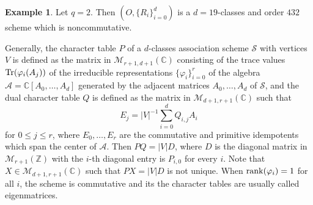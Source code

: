 \documentclass[11pt]{amsart}
\theoremstyle{plain} %
\theoremstyle{definition} %
\newtheorem{ex}[thm]{Example} %
\theoremstyle{remark} %
\begin{document}
\begin{ex}\label{SCS}%
Let $q=2$. Then $(O,\{R_i\}_{i=0}^d)$ is a $d=19$-classes and order $432$ scheme which is noncommutative. 

Generally, the character table $P$ of a $d$-classes association scheme $\mathcal{S}$ with vertices $V$ is defined as the matrix in $\mathcal{M}_{r+1,d+1}(\mathbb{C})$ consisting of
the trace values ${\rm Tr}(\varphi_i(A_j))$ of the irreducible representations $\{\varphi_i\}_{i=0}^r$ of the algebra $\mathcal{A}=\mathbb{C}[A_0,\dots,A_d]$ generated by the adjacent matrices $A_0,\dots,A_d$ of $\mathcal{S}$, and the dual character table $Q$ is defined as the matrix in $\mathcal{M}_{d+1,r+1}(\mathbb{C})$ such that 
$$
E_j=|V|^{-1}\sum_{i=0}^dQ_{i,j}A_i
$$
for $0\le j\le r$, where $E_0,\dots,E_r$ are the commutative and primitive idempotents which span the center of $\mathcal{A}$. Then $PQ=|V|D$, where $D$ is the diagonal matrix in $\mathcal{M}_{r+1}(\mathbb{Z})$ with the $i$-th diagonal entry is $P_{i,0}$
for every $i$. 
Note that $X\in\mathcal{M}_{d+1,r+1}(\mathbb{C})$ such that $PX=|V|D$ is not unique.
When ${\rm rank}(\varphi_i)=1$ for all $i$, the scheme is commutative and its the character tables are usually called eigenmatrices.


\end{ex}
\end{document}
